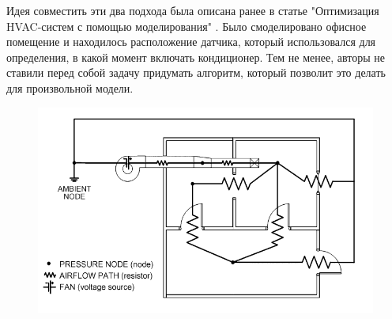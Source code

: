 Идея совместить эти два подхода была описана ранее в статье "Оптимизация HVAC-систем с помощью моделирования" \cite{blog}. Было смоделировано офисное помещение и находилось расположение датчика, который использовался для определения, в какой момент включать кондиционер. Тем не менее, авторы не ставили перед собой задачу придумать алгоритм, который позволит это делать для произвольной модели.

\begin{figure}[H]
\includegraphics[width=\textwidth]{images/NAF_example.png}
\caption{}
\label{NAF}
\end{figure}

